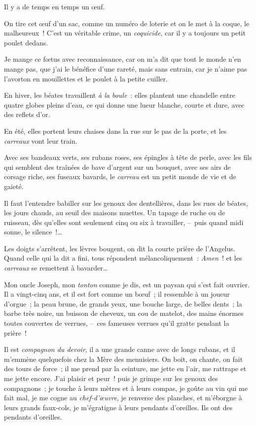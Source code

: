 \documentclass[french,twoside]{book} %
\begin{document}
Il y a de temps en temps un œuf.\par
On tire cet œuf d’un sac, comme un numéro de loterie et on le met à la coque, le malheureux ! C’est un véritable crime, un \emph{coquicide}, car il y a toujours un petit poulet dedans.\par
Je mange ce fœtus avec reconnaissance, car on m’a dit que tout le monde n’en mange pas, que j’ai le bénéfice d’une rareté, mais sans entrain, car je n’aime pas l’avorton en mouillettes et le poulet à la petite cuiller.\par
En hiver, les béates travaillent \emph{à la boule} : elles plantent une chandelle entre quatre globes pleins d’eau, ce qui donne une lueur blanche, courte et dure, avec des reflets d’or.\par
En été, elles portent leurs chaises dans la rue sur le pas de la porte, et les \emph{carreaux} vont leur train.\par
Avec ses bandeaux verts, ses rubans roses, ses épingles à tête de perle, avec les fils qui semblent des traînées de bave d’argent sur un bouquet, avec ses airs de corsage riche, ses fuseaux bavards, le \emph{carreau} est un petit monde de vie et de gaieté.\par
Il faut l’entendre babiller sur les genoux des dentellières, dans les rues de béates, les jours chauds, au seuil des maisons muettes. Un tapage de ruche ou de ruisseau, dès qu’elles sont seulement cinq ou six à travailler, – puis quand midi sonne, le silence !…\par
Les doigts s’arrêtent, les lèvres bougent, on dit la courte prière de l’Angelus. Quand celle qui la dit a fini, tous répondent mélancoliquement : \emph{Amen} ! et les \emph{carreaux} se remettent à bavarder…\par
\bigbreak
\noindent Mon oncle Joseph, mon \emph{tonton} comme je dis, est un paysan qui s’est fait ouvrier. Il a vingt-cinq ans, et il est fort comme un bœuf ; il ressemble à un joueur d’orgue ; la peau brune, de grands yeux, une bouche large, de belles dents ; la barbe très noire, un buisson de cheveux, un cou de matelot, des mains énormes toutes couvertes de verrues, – ces fameuses verrues qu’il gratte pendant la prière !\par
Il est \emph{compagnon du devoir}, il a une grande canne avec de longs rubans, et il m’emmène quelquefois chez la Mère des menuisiers. On boit, on chante, on fait des tours de force ; il me prend par la ceinture, me jette en l’air, me rattrape et me jette encore. J’ai plaisir et peur ! puis je grimpe sur les genoux des compagnons ; je touche à leurs mètres et à leurs compas, je goûte au vin qui me fait mal, je me cogne au \emph{chef-d’œuvre}, je renverse des planches, et m’éborgne à leurs grands faux-cols, je m’égratigne à leurs pendants d’oreilles. Ils ont des pendants d’oreilles.\par
\end{document}
